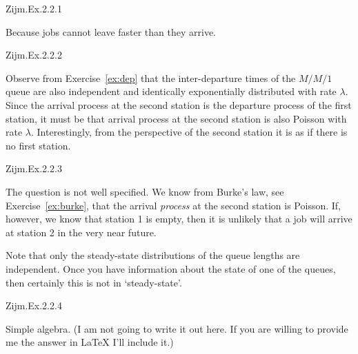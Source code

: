 \begin{exercise}
Zijm.Ex.2.2.1
\begin{solution}
Because jobs cannot leave faster than they arrive.
\end{solution}
\end{exercise}

\begin{exercise}
Zijm.Ex.2.2.2
\begin{solution}
  Observe from Exercise~\ref{ex:dep} that the inter-departure times
  of the $M/M/1$ queue are also independent and identically
  exponentially distributed with rate $\lambda$. Since the arrival
  process at the second station is the departure process of the first
  station, it must be that arrival process at the second station is
  also Poisson with rate $\lambda$.  Interestingly, from the
  perspective of the second station it is as if there is no first
  station.
\end{solution}
\end{exercise}



\begin{exercise}
Zijm.Ex.2.2.3 
\begin{solution}
  The question is not well specified. We know from Burke's law, see Exercise~\ref{ex:burke}, that
  the arrival \emph{process} at the second station is Poisson.  If,
  however, we know that station 1 is empty, then it is unlikely that a
  job will arrive at station 2 in the very near future.

  Note that only the steady-state distributions of the queue lengths
  are independent. Once you have information about the state of one of
  the queues, then certainly this is not in `steady-state'.
\end{solution}
\end{exercise}

\begin{exercise}
Zijm.Ex.2.2.4
\begin{solution}
  Simple algebra.  (I am not going to write it out here. If you are
  willing to provide me the answer in \LaTeX\/ I'll include it.)
\end{solution}
\end{exercise}

